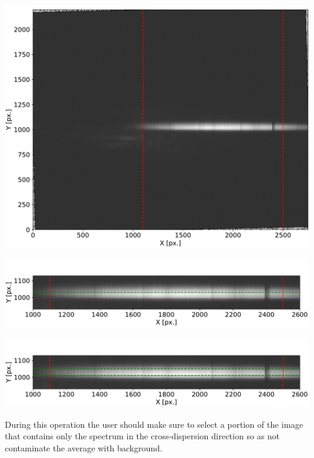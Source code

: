 \documentclass[a4paper]{article}
\newenvironment{Figure}
	{\par\medskip\noindent\minipage{\linewidth}}
	{\endminipage\par\medskip}
\begin{document}
\begin{multicols}{2}
			\begin{Figure}
				\centering
				\includegraphics[width=\linewidth]{Extr_step1.pdf}
				\label{fig:extr1}
			\end{Figure}
			\begin{Figure}
				\centering
				\includegraphics[width=\linewidth]{Extr_step2.pdf}
				\label{fig:extr2}
			\end{Figure}
			\begin{Figure}
				\centering
				\includegraphics[width=\linewidth]{Extr_step3.pdf}
				\label{fig:extr3}
			\end{Figure}
			
			During this operation the user should make sure to select a portion of the image that contains only the spectrum in the cross-dispersion direction so as not contaminate the average with background.\\
			

\end{multicols}
\end{document}
